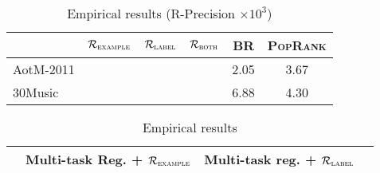 \begin{table}[!h]
\centering
\caption{Empirical results (R-Precision $\times 10^3$)}
\small
\begin{tabular}{l|ccccc}
\toprule
{}            & $\mathcal{R}_\textsc{example}$ & $\mathcal{R}_\textsc{label}$ & $\mathcal{R}_\textsc{both}$ & BR & \textsc{PopRank} \\
\midrule
AotM-2011     &  &  &  & 2.05 & 3.67 \\
30Music       &  &  &  & 6.88 & 4.30 \\
\bottomrule
\end{tabular}
\end{table}

\begin{table}[!h]
\centering
\caption{Empirical results}
\begin{tabular}{l|ccc}
\toprule
{}            & Multi-task Reg. + $\mathcal{R}_\textsc{example}$ & Multi-task reg. + $\mathcal{R}_\textsc{label}$ \\
\midrule
\bottomrule
\end{tabular}
\end{table}
